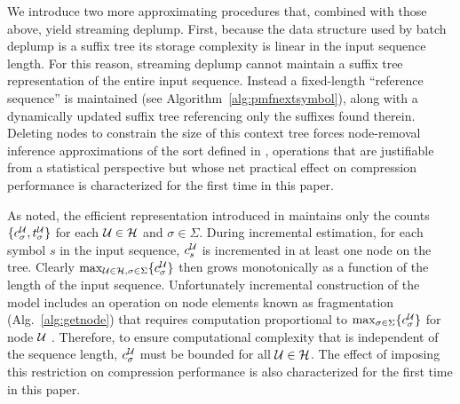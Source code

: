 We introduce two more approximating procedures that, combined with those above, yield streaming deplump.  First, because the data structure used by batch deplump is a suffix tree its storage complexity is linear in the input sequence length.  For this reason, streaming deplump cannot maintain a suffix tree representation of the entire input sequence.  Instead a fixed-length ``reference sequence''  is maintained (see Algorithm~\ref{alg:pmfnextsymbol}), along with a dynamically updated suffix tree referencing only the suffixes found therein.  Deleting nodes to constrain the size of this context tree forces node-removal inference approximations of the sort defined in \citep{Bartlett2010}, operations that are justifiable from a statistical perspective but whose net practical effect on compression performance is characterized for the first time in this paper. %

As noted, the efficient representation introduced in \cite{Gasthaus2011} maintains only the counts $\{ c^\U_\sigma,t^\U_\sigma\} $ for each $\U \in \mathcal{H}$ and $\sigma \in \Sigma$.  During incremental estimation, for each symbol $s$ in the input sequence, $c^\U_s$ is incremented in at least one node on the tree.  Clearly $\max_{\U \in \mathcal{H}, \sigma \in \Sigma} \{ c^\U_\sigma \}$ then grows monotonically as a function of the length of the input sequence. Unfortunately incremental construction of the model includes an operation on node elements known as fragmentation (Alg.~\ref{alg:getnode}) that requires computation proportional to $\max_{\sigma \in \Sigma} \{ c_\sigma^\U \}$ for node $\U$ \citep{Gasthaus2011}. Therefore, to ensure computational complexity that is independent of the sequence length, $c^\U_\sigma$ must be bounded for all $\U \in \mathcal{H}$.  The effect of imposing this restriction on compression performance is also characterized for the first time in this paper. 






